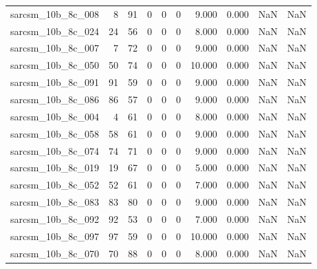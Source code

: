 \documentclass{article}
\begin{document}
\begin{longtable}{lrrrrrrrrr}
sarcsm\_10b\_8c\_008 & 8 & 91 & 0 & 0 & 0 & 9.000 & 0.000 & NaN & NaN \\
sarcsm\_10b\_8c\_024 & 24 & 56 & 0 & 0 & 0 & 8.000 & 0.000 & NaN & NaN \\
sarcsm\_10b\_8c\_007 & 7 & 72 & 0 & 0 & 0 & 9.000 & 0.000 & NaN & NaN \\
sarcsm\_10b\_8c\_050 & 50 & 74 & 0 & 0 & 0 & 10.000 & 0.000 & NaN & NaN \\
sarcsm\_10b\_8c\_091 & 91 & 59 & 0 & 0 & 0 & 9.000 & 0.000 & NaN & NaN \\
sarcsm\_10b\_8c\_086 & 86 & 57 & 0 & 0 & 0 & 9.000 & 0.000 & NaN & NaN \\
sarcsm\_10b\_8c\_004 & 4 & 61 & 0 & 0 & 0 & 8.000 & 0.000 & NaN & NaN \\
sarcsm\_10b\_8c\_058 & 58 & 61 & 0 & 0 & 0 & 9.000 & 0.000 & NaN & NaN \\
sarcsm\_10b\_8c\_074 & 74 & 71 & 0 & 0 & 0 & 9.000 & 0.000 & NaN & NaN \\
sarcsm\_10b\_8c\_019 & 19 & 67 & 0 & 0 & 0 & 5.000 & 0.000 & NaN & NaN \\
sarcsm\_10b\_8c\_052 & 52 & 61 & 0 & 0 & 0 & 7.000 & 0.000 & NaN & NaN \\
sarcsm\_10b\_8c\_083 & 83 & 80 & 0 & 0 & 0 & 9.000 & 0.000 & NaN & NaN \\
sarcsm\_10b\_8c\_092 & 92 & 53 & 0 & 0 & 0 & 7.000 & 0.000 & NaN & NaN \\
sarcsm\_10b\_8c\_097 & 97 & 59 & 0 & 0 & 0 & 10.000 & 0.000 & NaN & NaN \\
sarcsm\_10b\_8c\_070 & 70 & 88 & 0 & 0 & 0 & 8.000 & 0.000 & NaN & NaN \\
\end{longtable}
\end{document}
